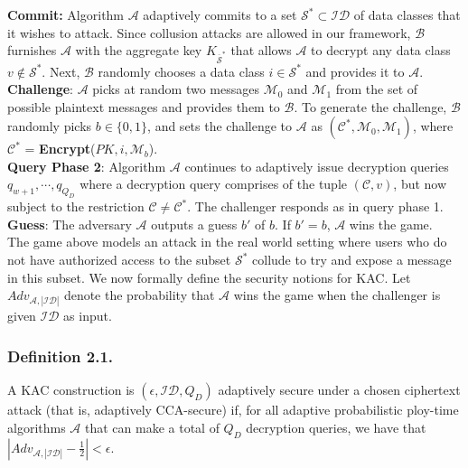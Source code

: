 \noindent\textbf{Commit:} Algorithm $\mathcal{A}$ adaptively commits to a set ${\mathcal{S}}^{*} \subset \mathcal{ID}$ of data classes that it wishes to attack. Since collusion attacks are allowed in our framework, $\mathcal{B}$ furnishes $\mathcal{A}$ with the aggregate key $K_{\overline{\mathcal{S}}^{*}}$ that allows $\mathcal{A}$ to decrypt any data class $v\notin{\mathcal{S}}^{*}$. Next, $\mathcal{B}$ randomly chooses a data class $i\in{\mathcal{S}}^{*}$ and provides it to $\mathcal{A}$.\\ 
 
\noindent\textbf{Challenge}: $\mathcal{A}$ picks at random two messages $\mathcal{M}_0$ and $\mathcal{M}_1$ from the set of possible plaintext messages and provides them to $\mathcal{B}$. To generate the challenge, $\mathcal{B}$ randomly picks $b\in\{0,1\}$, and sets the challenge to $\mathcal{A}$ as $(\mathcal{C}^{*},\mathcal{M}_0,\mathcal{M}_1)$, where ${\mathcal{C}}^{*}$ = \textbf{Encrypt}($PK,i,\mathcal{M}_b$).\\
 
\noindent\textbf{Query Phase 2}: Algorithm $\mathcal{A}$ continues to adaptively issue decryption queries $q_{w+1},\cdots,q_{Q_D}$ where a decryption query comprises of the tuple $(\mathcal{C},v)$, but now subject to the restriction $\mathcal{C}\neq {\mathcal{C}}^{*}$. The challenger responds as in query phase 1.\\ 
 
 
\noindent\textbf{Guess}: The adversary $\mathcal{A}$ outputs a guess $b'$ of $b$. If $b' = b$, $\mathcal{A}$ wins the game.\\


\noindent The game above models an attack in the real world setting where users who do not have authorized access to the subset ${\mathcal{S}}^{*}$ collude to try and expose a message in this subset. We now formally define the security notions for KAC. Let $Adv_{\mathcal{A},|\mathcal{ID}|}$ denote the probability that $\mathcal{A}$ wins the game when the challenger is given $\mathcal{ID}$ as input.

\subsubsection{Definition 2.1.}
 A KAC construction is $(\epsilon,\mathcal{ID},Q_D)$ adaptively secure under a chosen ciphertext attack (that is, adaptively CCA-secure) if, for all adaptive probabilistic ploy-time algorithms $\mathcal{A}$ that can make a total of $Q_D$ decryption queries, we have that $|Adv_{\mathcal{A},|\mathcal{ID}|}-\frac{1}{2}| < \epsilon$.
 
